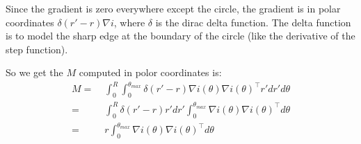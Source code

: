 \documentclass[11pt,english]{article}
\begin{document}
\begin{enumerate}
Since the gradient is zero everywhere except the circle, the gradient is in polar coordinates
$\delta (r'-r) \nabla i$, where $\delta$ is the dirac delta function. The delta function is to model the sharp edge
at the boundary of the circle (like the derivative of the step function). 

So we get the $M$ computed in polor coordinates is:
\begin{align*}
    M =&\; \int_{0}^{R} \int_{0}^{\theta_{max}} \delta(r'-r) \nabla i(\theta) \nabla i(\theta)^\top r' dr' d\theta \\
      =&\; \int_{0}^{R} \delta(r'-r) r' dr' \int_{0}^{\theta_{max}} \nabla i(\theta) \nabla i(\theta)^\top d\theta \\
      =&\; r \int_{0}^{\theta_{max}} \nabla i(\theta) \nabla i(\theta)^\top d\theta \\
\end{align*}


\end{enumerate}
\end{document}
